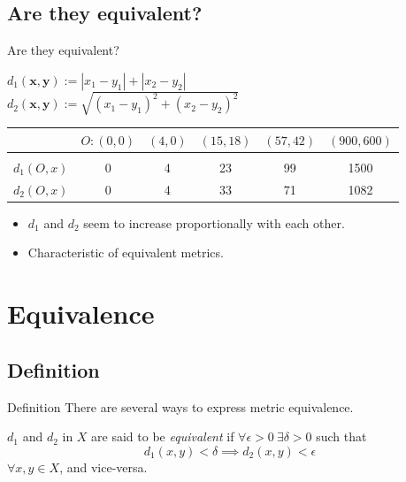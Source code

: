 \documentclass{beamer}
\begin{document}
\subsection{Are they equivalent?}
\begin{frame}{Are they equivalent?}

    \begin{block}
        $d_1(\textbf{x},\textbf{y}) := |x_1 - y_1| + |x_2 - y_2|$ \\

        $d_2{(\textbf{x},\textbf{y})} := \sqrt{{(x_1 - y_1)}^2 + {(x_2 - y_2)}^2}$
    \end{block}

    \begin{tabular}{r c c c c c}
        & $O:(0,0)$ & $(4,0)$ & $(15,18)$ & $(57,42)$ & $(900,600)$ \\
        \midrule \\
        $d_1(O,x)$ & 0 & 4 & 23 & 99 & 1500 \\
        $d_2(O,x)$ & 0 & 4 & 33 & 71 & 1082 \\
    \end{tabular}

    \pause{}

    \begin{itemize}
        \item $d_1$ and $d_2$ seem to increase proportionally with each other. \\
        \item Characteristic of equivalent metrics.
    \end{itemize}

\end{frame}

\section{Equivalence}

\subsection{Definition}

\begin{frame}{Definition}
    There are several ways to express metric equivalence.
    \begin{definition}{}
        $d_1$ and $d_2$ in $X$ are said to be \emph{equivalent} if
        $\forall \epsilon > 0 \ \exists \delta > 0$ such that
        \[
            d_1(x,y) < \delta \implies d_2(x,y) < \epsilon
        \]
        $\forall x,y \in X$, and vice-versa.
    \end{definition}
\end{frame}
\end{document}

